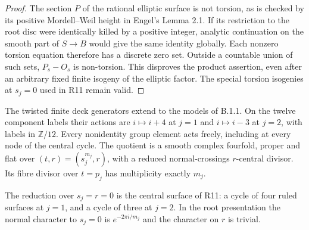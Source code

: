 \begin{proof}
The section $P$ of the rational elliptic surface is not
torsion, as is checked by its positive Mordell--Weil height
in Engel's Lemma 2.1. If its restriction to the root disc
were identically killed by a positive integer, analytic
continuation on the smooth part of $S\to B$ would give the
same identity globally. Each nonzero torsion equation
therefore has a discrete zero set. Outside a countable union
of such sets, $P_s-O_s$ is non-torsion. This disproves the
product assertion, even after an arbitrary fixed finite
isogeny of the elliptic factor. The special torsion
isogenies at $s_j=0$ used in R11 remain valid.
\end{proof}

\begin{theorem}\label{push:src:B.1.2}\label{push:B12}
The twisted finite deck generators extend to the models of
B.1.1. On the twelve component labels their actions are
$i\mapsto i+4$ at $j=1$ and $i\mapsto i-3$ at $j=2$,
with labels in $\mathbb Z/12$. Every nonidentity group
element acts freely, including at every node of the central
cycle. The quotient is a smooth complex fourfold, proper
and flat over $(t,r)=(s_j^{m_j},r)$, with a reduced
normal-crossings $r$-central divisor. Its fibre divisor
over $t=p_j$ has multiplicity exactly $m_j$.

The reduction over $s_j=r=0$ is the central surface of R11:
a cycle of four ruled surfaces at $j=1$, and a cycle of
three at $j=2$. In the root presentation the normal
character to $s_j=0$ is $e^{-2\pi i/m_j}$ and the
character on $r$ is trivial.
\end{theorem}
